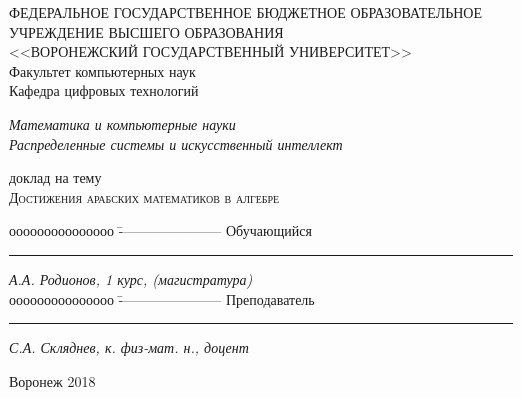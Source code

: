 \thispagestyle{empty}

\begin{center}
ФЕДЕРАЛЬНОЕ ГОСУДАРСТВЕННОЕ БЮДЖЕТНОЕ ОБРАЗОВАТЕЛЬНОЕ УЧРЕЖДЕНИЕ ВЫСШЕГО ОБРАЗОВАНИЯ\\
<<ВОРОНЕЖСКИЙ ГОСУДАРСТВЕННЫЙ УНИВЕРСИТЕТ>>\\
\vspace{0.25cm}
Факультет компьютерных наук\\
\vspace{0.25cm}
Кафедра цифровых технологий\\

\vspace{1cm}

\textit{Математика и компьютерные науки}\\
\textit{Распределенные системы и искусственный интеллект}\\

\vspace{4cm}

\large{доклад на тему\\}
\Huge{\scshape{Достижения арабских математиков в алгебре}}

\vspace{3cm}


\begin{small}
\begin{tabbing}
ооооооооооооооо \=  ----------------------  \kill
Обучающийся \>  \rule[0mm]{3cm}{0,3mm}  \textit{А.А. Родионов, 1 курс, (магистратура)} \\ 
ооооооооооооооо \=  ----------------------  \kill
Преподаватель\>  \rule[0mm]{3cm}{0,3mm}  \textit{С.А. Скляднев, к. физ-мат. н., доцент }
\end{tabbing}

\vspace{9cm}

\centerline{Воронеж 2018}
\end{small}

\end{center}
